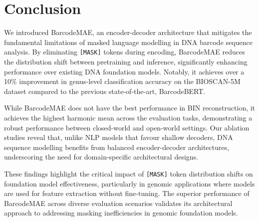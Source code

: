 \section{Conclusion}

We introduced BarcodeMAE, an encoder-decoder architecture that mitigates the fundamental limitations of masked language modelling in DNA barcode sequence analysis. By eliminating \texttt{[MASK]} tokens during encoding, BarcodeMAE reduces the distribution shift between pretraining and inference, significantly enhancing performance over existing DNA foundation models. Notably, it achieves over a 10\% improvement in genus-level classification accuracy on the BIOSCAN-5M dataset compared to the previous state-of-the-art, BarcodeBERT.

While BarcodeMAE does not have the best performance in BIN reconstruction, it achieves the highest harmonic mean across the evaluation tasks, demonstrating a robust performance between closed-world and open-world settings. Our ablation studies reveal that, unlike NLP models that favour shallow decoders, DNA sequence modelling benefits from balanced encoder-decoder architectures, underscoring the need for domain-specific architectural designs.

These findings highlight the critical impact of \texttt{[MASK]} token distribution shifts on foundation model effectiveness, particularly in genomic applications where models are used for feature extraction without fine-tuning. The superior performance of BarcodeMAE across diverse evaluation scenarios validates its architectural approach to addressing masking inefficiencies in genomic foundation models.
